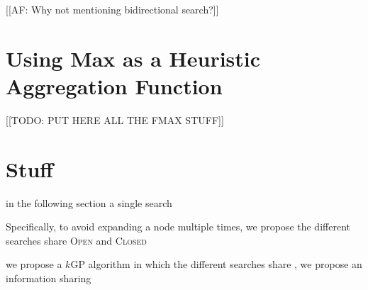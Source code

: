 \documentclass[twoside,11pt]{article}
\newcommand{\kgs}{$k$GP\xspace}
\newcommand{\kxastar}{k$\times$A$^*$\xspace}
\newcommand{\open}{\textsc{Open}\xspace}
\newcommand{\closed}{\textsc{Closed}\xspace}
\begin{document}
[[AF: Why not mentioning bidirectional search?]]




\appendix
\section*{Using Max as a Heuristic Aggregation Function}

[[TODO: PUT HERE ALL THE FMAX STUFF]]

\section*{Stuff}

in the following section a single search 

Specifically, 
to avoid expanding a node multiple times, we propose the different searches share \open and \closed 

we propose a \kgs algorithm in which the different searches share , we propose an information sharing 

\end{document}
